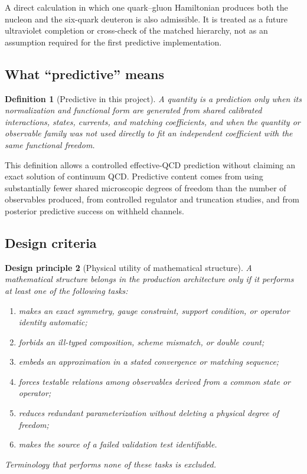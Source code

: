 \documentclass[11pt]{article}
\newtheorem{definition}{Definition}[section]
\newtheorem{principle}[definition]{Design principle}
\begin{document}
A direct calculation in which one quark--gluon Hamiltonian produces both the
nucleon and the six-quark deuteron is also admissible.  It is treated as a
future ultraviolet completion or cross-check of the matched hierarchy, not
as an assumption required for the first predictive implementation.

\subsection{What ``predictive'' means}

\begin{definition}[Predictive in this project]
A quantity is a prediction only when its normalization and functional form
are generated from shared calibrated interactions, states, currents, and
matching coefficients, and when the quantity or observable family was not
used directly to fit an independent coefficient with the same functional
freedom.
\end{definition}

This definition allows a controlled effective-QCD prediction without claiming
an exact solution of continuum QCD.  Predictive content comes from using
substantially fewer shared microscopic degrees of freedom than the number of
observables produced, from controlled regulator and truncation studies, and
from posterior predictive success on withheld channels.

\subsection{Design criteria}

\begin{principle}[Physical utility of mathematical structure]
A mathematical structure belongs in the production architecture only if it
performs at least one of the following tasks:
\begin{enumerate}
\item makes an exact symmetry, gauge constraint, support condition, or
operator identity automatic;
\item forbids an ill-typed composition, scheme mismatch, or double count;
\item embeds an approximation in a stated convergence or matching sequence;
\item forces testable relations among observables derived from a common state
or operator;
\item reduces redundant parameterization without deleting a physical degree
of freedom;
\item makes the source of a failed validation test identifiable.
\end{enumerate}
Terminology that performs none of these tasks is excluded.
\end{principle}
\end{document}
